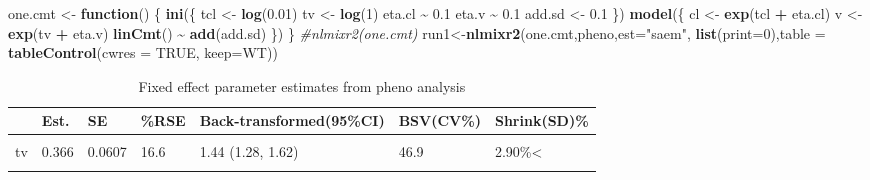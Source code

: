 \documentclass[
]{article}
\newenvironment{Shaded}{\begin{snugshade}}{\end{snugshade}}
\newcommand{\AttributeTok}[1]{\textcolor[rgb]{0.13,0.29,0.53}{#1}}
\newcommand{\CommentTok}[1]{\textcolor[rgb]{0.56,0.35,0.01}{\textit{#1}}}
\newcommand{\ConstantTok}[1]{\textcolor[rgb]{0.56,0.35,0.01}{#1}}
\newcommand{\ControlFlowTok}[1]{\textcolor[rgb]{0.13,0.29,0.53}{\textbf{#1}}}
\newcommand{\DecValTok}[1]{\textcolor[rgb]{0.00,0.00,0.81}{#1}}
\newcommand{\FloatTok}[1]{\textcolor[rgb]{0.00,0.00,0.81}{#1}}
\newcommand{\FunctionTok}[1]{\textcolor[rgb]{0.13,0.29,0.53}{\textbf{#1}}}
\newcommand{\NormalTok}[1]{#1}
\newcommand{\OtherTok}[1]{\textcolor[rgb]{0.56,0.35,0.01}{#1}}
\newcommand{\SpecialCharTok}[1]{\textcolor[rgb]{0.81,0.36,0.00}{\textbf{#1}}}
\newcommand{\StringTok}[1]{\textcolor[rgb]{0.31,0.60,0.02}{#1}}
\begin{document}
\begin{Shaded}
\begin{Highlighting}[]
\NormalTok{one.cmt }\OtherTok{\textless{}{-}} \ControlFlowTok{function}\NormalTok{() \{}
  \FunctionTok{ini}\NormalTok{(\{ }
\NormalTok{    tcl }\OtherTok{\textless{}{-}} \FunctionTok{log}\NormalTok{(}\FloatTok{0.01}\NormalTok{) }
\NormalTok{    tv }\OtherTok{\textless{}{-}} \FunctionTok{log}\NormalTok{(}\DecValTok{1}\NormalTok{)}
\NormalTok{    eta.cl }\SpecialCharTok{\textasciitilde{}} \FloatTok{0.1}
\NormalTok{    eta.v }\SpecialCharTok{\textasciitilde{}} \FloatTok{0.1}
\NormalTok{    add.sd }\OtherTok{\textless{}{-}} \FloatTok{0.1}
\NormalTok{  \})}
  \FunctionTok{model}\NormalTok{(\{}
\NormalTok{    cl }\OtherTok{\textless{}{-}} \FunctionTok{exp}\NormalTok{(tcl }\SpecialCharTok{+}\NormalTok{ eta.cl)}
\NormalTok{    v }\OtherTok{\textless{}{-}} \FunctionTok{exp}\NormalTok{(tv }\SpecialCharTok{+}\NormalTok{ eta.v)}
    \FunctionTok{linCmt}\NormalTok{() }\SpecialCharTok{\textasciitilde{}} \FunctionTok{add}\NormalTok{(add.sd)}
\NormalTok{  \})}
\NormalTok{\}}
\CommentTok{\#nlmixr2(one.cmt)}
\NormalTok{run1}\OtherTok{\textless{}{-}}\FunctionTok{nlmixr2}\NormalTok{(one.cmt,pheno,}\AttributeTok{est=}\StringTok{"saem"}\NormalTok{, }
              \FunctionTok{list}\NormalTok{(}\AttributeTok{print=}\DecValTok{0}\NormalTok{),}\AttributeTok{table =} \FunctionTok{tableControl}\NormalTok{(}\AttributeTok{cwres =} \ConstantTok{TRUE}\NormalTok{, }\AttributeTok{keep=}\StringTok{\textquotesingle{}WT\textquotesingle{}}\NormalTok{))}
\end{Highlighting}
\end{Shaded}

\begin{table}
\centering
\caption{\label{tab:nlmixfix}Fixed effect parameter estimates from pheno analysis}
\centering
\begin{tabular}[t]{lllllll}
\toprule
  & Est. & SE & \%RSE & Back-transformed(95\%CI) & BSV(CV\%) & Shrink(SD)\%\\
\midrule
\cellcolor{gray!10}{tcl} & \cellcolor{gray!10}{-5.18} & \cellcolor{gray!10}{0.0884} & \cellcolor{gray!10}{1.71} & \cellcolor{gray!10}{0.00563 (0.00473, 0.0067)} & \cellcolor{gray!10}{51.2} & \cellcolor{gray!10}{30.0\%=}\\
tv & 0.366 & 0.0607 & 16.6 & 1.44 (1.28, 1.62) & 46.9 & 2.90\%<\\
\cellcolor{gray!10}{add.sd} & \cellcolor{gray!10}{2.79} & \cellcolor{gray!10}{} & \cellcolor{gray!10}{} & \cellcolor{gray!10}{2.79} & \cellcolor{gray!10}{} & \cellcolor{gray!10}{}\\
\bottomrule
\end{tabular}
\end{table}
\end{document}
